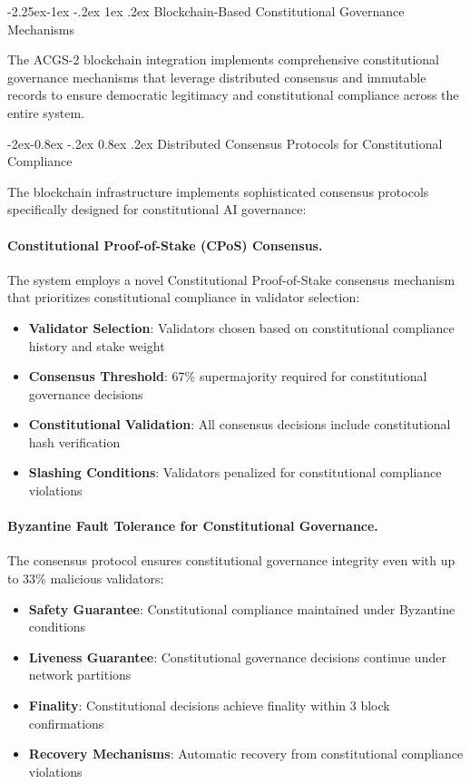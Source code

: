\documentclass[manuscript,screen,9pt]{acmart}
\makeatletter
\renewcommand\subsection{\@startsection{subsection}{2}{\z@}%
  {-2.25ex\@plus -1ex \@minus -.2ex}%
  {1ex \@plus .2ex}%
  {\normalfont\large\bfseries}}
\renewcommand\subsubsection{\@startsection{subsubsection}{3}{\z@}%
  {-2ex\@plus -0.8ex \@minus -.2ex}%
  {0.8ex \@plus .2ex}%
  {\normalfont\normalsize\bfseries}}
\makeatother
\begin{document}
\subsection{Blockchain-Based Constitutional Governance Mechanisms}
\label{subsec:blockchain_constitutional_mechanisms}

The ACGS-2 blockchain integration implements comprehensive constitutional governance mechanisms that leverage distributed consensus and immutable records to ensure democratic legitimacy and constitutional compliance across the entire system.

\subsubsection{Distributed Consensus Protocols for Constitutional Compliance}
\label{subsubsec:distributed_consensus_protocols}

The blockchain infrastructure implements sophisticated consensus protocols specifically designed for constitutional AI governance:

\paragraph{Constitutional Proof-of-Stake (CPoS) Consensus.} The system employs a novel Constitutional Proof-of-Stake consensus mechanism that prioritizes constitutional compliance in validator selection:
\begin{itemize}[itemsep=1pt,parsep=1pt]
    \item \textbf{Validator Selection}: Validators chosen based on constitutional compliance history and stake weight
    \item \textbf{Consensus Threshold}: 67\% supermajority required for constitutional governance decisions
    \item \textbf{Constitutional Validation}: All consensus decisions include constitutional hash verification
    \item \textbf{Slashing Conditions}: Validators penalized for constitutional compliance violations
\end{itemize}

\paragraph{Byzantine Fault Tolerance for Constitutional Governance.} The consensus protocol ensures constitutional governance integrity even with up to 33\% malicious validators:
\begin{itemize}[itemsep=1pt,parsep=1pt]
    \item \textbf{Safety Guarantee}: Constitutional compliance maintained under Byzantine conditions
    \item \textbf{Liveness Guarantee}: Constitutional governance decisions continue under network partitions
    \item \textbf{Finality}: Constitutional decisions achieve finality within 3 block confirmations
    \item \textbf{Recovery Mechanisms}: Automatic recovery from constitutional compliance violations
\end{itemize}
\end{document}
